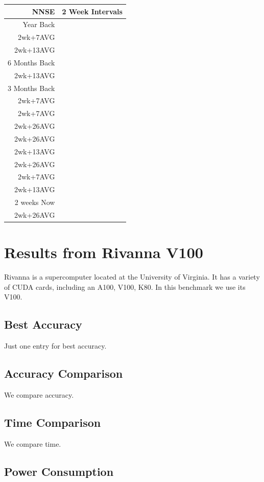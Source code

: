 \documentclass[11pt,twocolumn]{article}
\begin{document}
\begin{tabular}{rl}
NNSE & 2 Week Intervals \\
\hline
Year Back & \\ %
2wk+7AVG & \\ %
2wk+13AVG & \\
6 Months Back & \\
2wk+13AVG & \\
3 Months Back & \\
2wk+7AVG & \\
2wk+7AVG & \\
2wk+26AVG & \\
2wk+26AVG & \\
2wk+13AVG & \\
2wk+26AVG & \\
2wk+7AVG & \\
2wk+13AVG & \\
2 weeks Now & \\
2wk+26AVG & \\
\hline
\end{tabular}

\section{Results from Rivanna V100}

Rivanna is a supercomputer located at the University
of Virginia. It has a variety of CUDA cards, including
an A100, V100, K80. In this benchmark we use its V100.

\subsection{Best Accuracy}

Just one entry for best accuracy.

\subsection{Accuracy Comparison}

We compare accuracy.

\subsection{Time Comparison}

We compare time.

\subsection{Power Consumption}
\end{document}
